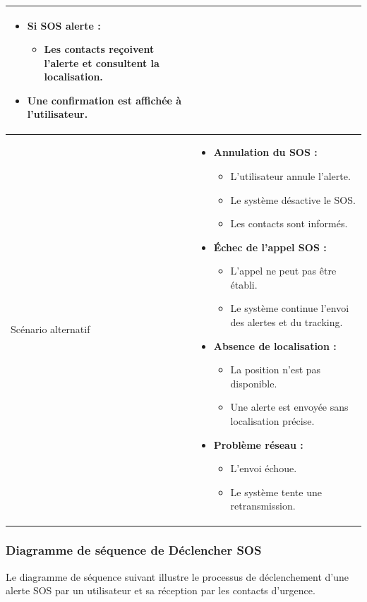 \begin{longtable}{|p{}|>{\raggedright\arraybackslash}p{}|}
\begin{itemize}
\item \textbf{Si SOS alerte :}
\begin{itemize}
\item Les contacts reçoivent l’alerte et consultent la localisation.
\end{itemize}

\item Une confirmation est affichée à l’utilisateur.
\end{itemize}
\\ \hline

Scénario alternatif &
\begin{itemize}

\item \textbf{Annulation du SOS :}
\begin{itemize}
\item L’utilisateur annule l’alerte.
\item Le système désactive le SOS.
\item Les contacts sont informés.
\end{itemize}

\item \textbf{Échec de l’appel SOS :}
\begin{itemize}
\item L’appel ne peut pas être établi.
\item Le système continue l’envoi des alertes et du tracking.
\end{itemize}

\item \textbf{Absence de localisation :}
\begin{itemize}
\item La position n’est pas disponible.
\item Une alerte est envoyée sans localisation précise.
\end{itemize}

\item \textbf{Problème réseau :}
\begin{itemize}
\item L’envoi échoue.
\item Le système tente une retransmission.
\end{itemize}

\end{itemize}
\\ \hline

\end{longtable}

\subsubsection{Diagramme de séquence de \og Déclencher SOS \fg}
Le diagramme de séquence suivant illustre le processus de déclenchement d'une alerte SOS par un utilisateur et sa réception par les contacts d'urgence.

